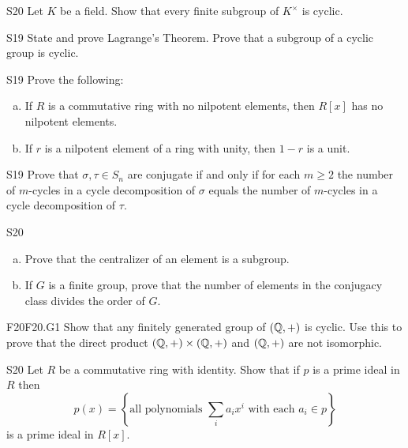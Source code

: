 \documentclass[../AlgebraQualSolutions.tex]{subfiles}
\begin{document}
	\begin{prob}{S20}{}
	Let $K$ be a field. Show that every finite subgroup of $K^\times$ is cyclic.
	\end{prob}

	\begin{prob}{S19}{}
	State and prove Lagrange's Theorem. Prove that a subgroup of a cyclic group is cyclic.
	\end{prob}

	\begin{prob}{S19}{}
	Prove the following:
	\begin{enumerate}[(a)]
	\item If $R$ is a commutative ring with no nilpotent elements, then $R[x]$ has no nilpotent elements.
	\item If $r$ is a nilpotent element of a ring with unity, then $1 - r$ is a unit.
	\end{enumerate}
	\end{prob}
	

	
	\begin{prob}{S19}{}
	Prove that $\sigma,\tau \in S_n$ are conjugate if and only if for each $m \geq 2$ the number of $m$-cycles in a cycle decomposition of $\sigma$ equals the number of $m$-cycles in a cycle decomposition of $\tau$.
	\end{prob}
	
	\begin{prob}{S20}{}
	\begin{enumerate}[(a)]
	\item Prove that the centralizer of an element is a subgroup.
	\item If $G$ is a finite group, prove that the number of elements in the conjugacy class divides the order of $G$.
	\end{enumerate}
	\end{prob}
	
	\begin{prob}{F20}{F20.G1}
	Show that any finitely generated group of $(\mathbb{Q},+)$ is cyclic. Use this to prove that the direct product $(\mathbb{Q},+) \times (\mathbb{Q},+)$ and $(\mathbb{Q},+)$ are not isomorphic.
	\end{prob}

	\begin{prob}{S20}{}
	Let $R$ be a commutative ring with identity. Show that if $p$ is a prime ideal in $R$ then
		\[p(x) = \left\{\textrm{all polynomials } \sum_i a_ix^i \textrm{ with each } a_i \in p \right\} \]
	is a prime ideal in $R[x]$.
	\end{prob}
	
\end{document}
